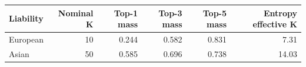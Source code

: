 \begin{tabular}{lrrrrr}
\toprule
Liability & Nominal K & Top-1 mass & Top-3 mass & Top-5 mass & Entropy effective K \\
\midrule
European & 10 & 0.244 & 0.582 & 0.831 & 7.31 \\
Asian & 50 & 0.585 & 0.696 & 0.738 & 14.03 \\
\bottomrule
\end{tabular}
